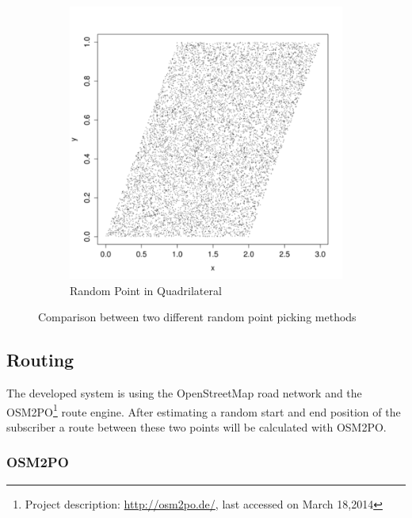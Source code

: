 \documentclass[master,english]{hgbthesis}
\begin{document}
\begin{figure}
\begin{subfigure}[b]{0.45\textwidth}
		\includegraphics[width=\textwidth]{randompointquadliteral.png}

		\caption{Random Point in  Quadrilateral}

		\label{fig:quadrilateral}

	\end{subfigure}

	\caption{Comparison between two different random point picking methods}

	\label{fig:comprandom}

\end{figure}

\subsection{Routing}

The developed system is using the OpenStreetMap road network and the OSM2PO\footnote{Project description: \url{http://osm2po.de/}, last accessed on March 18,2014} route engine. After estimating a random start and end position of the subscriber a route between these two points will be calculated with OSM2PO.

\subsubsection{OSM2PO}
\end{document}
